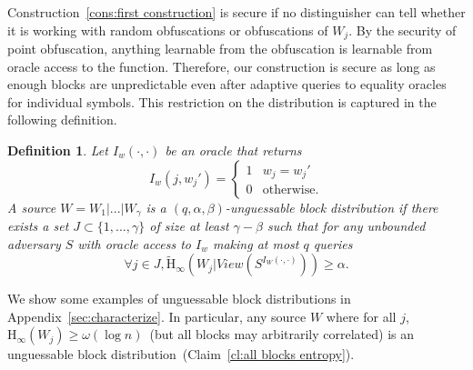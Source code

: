 \documentclass[11pt]{article}
\newcommand{\apref}[1]{\mbox{Appendix~\ref{#1}}}
\newcommand{\clref}[1]{\mbox{Claim~\ref{#1}}}
\newcommand{\consref}[1]{\mbox{Construction~\ref{#1}}}
\newcommand{\Hoo}{\mathrm{H}_\infty}
\newcommand{\Hav}{\tilde{\mathrm{H}}_\infty}
\newtheorem{definition}[theorem]{Definition}
\begin{document}
\consref{cons:first construction} is secure if no distinguisher can tell whether it is working with random obfuscations or obfuscations of $W_j$.  By the security of point obfuscation, anything learnable from the obfuscation is learnable from oracle access to the function. Therefore, our construction is secure as long as enough blocks are unpredictable even after adaptive queries to equality oracles for individual symbols. This restriction on the distribution is captured in the following definition.

\begin{definition}
\label{def:block guessable}
Let $I_w (\cdot, \cdot)$ be an oracle that returns \[I_w(j, w_j')=
\begin{cases}
1 & w_j = w_j'\\
0 & \text{otherwise}.
\end{cases}
\]
A source $W = W_1| ... |W_\gamma$ is a $(q, \alpha, \beta)$-\emph{unguessable block distribution} if there exists a set $J\subset\{1,..., \gamma\}$ of size at least $\gamma -\beta$ such that for any unbounded adversary $S$ with oracle access to $I_w$ making at most $q$ queries
\[
\forall j\in J, \Hav(W_j |View(S^{I_{W}(\cdot, \cdot)}))\geq \alpha.
\]
\end{definition}

We show some examples of unguessable block distributions in \apref{sec:characterize}.  In particular, any source $W$ where for all $j$, $\Hoo(W_j) \geq \omega(\log n)$~(but all blocks may arbitrarily correlated) is an unguessable block distribution~(\clref{cl:all blocks entropy}).
\end{document}
